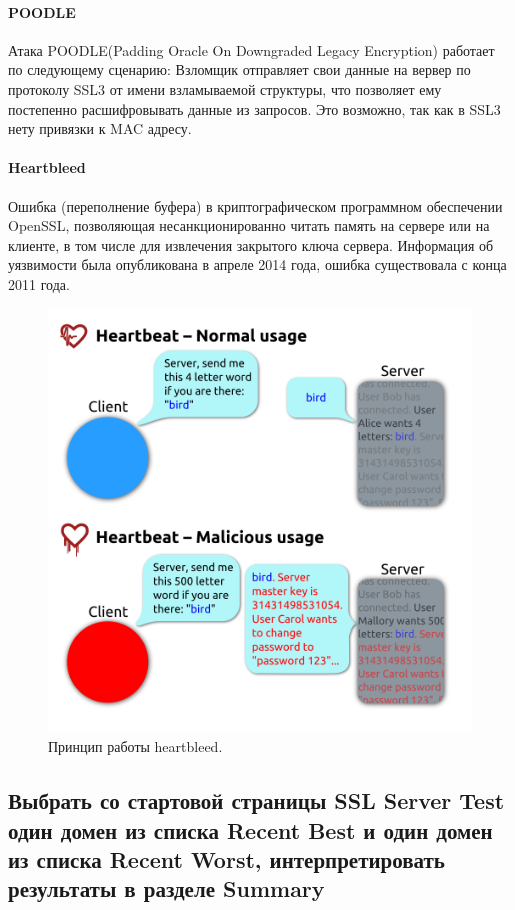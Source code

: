\documentclass[a4paper, 14pt]{article}				%
\begin{document}
\paragraph {POODLE\\}
Атака POODLE(Padding Oracle On Downgraded Legacy Encryption) работает по следующему сценарию: Взломщик отправляет свои данные на вервер по протоколу SSL3 от имени взламываемой структуры, что позволяет ему постепенно расшифровывать данные из запросов. Это возможно, так как в SSL3 нету привязки к MAC адресу.

\paragraph {Heartbleed\\}
Ошибка (переполнение буфера) в криптографическом программном обеспечении OpenSSL, позволяющая несанкционированно читать память на сервере или на клиенте, в том числе для извлечения закрытого ключа сервера. Информация об уязвимости была опубликована в апреле 2014 года, ошибка существовала с конца 2011 года.
\begin{figure}[h!]
\centering
\includegraphics[width=\textwidth]{rsrc/lab7_heartbleed}
\caption{Принцип работы heartbleed.}
\end{figure}
\subsection{Выбрать со стартовой страницы SSL Server Test один домен из списка Recent Best и один домен из списка Recent Worst, интерпретировать результаты в разделе Summary}
\end{document}
